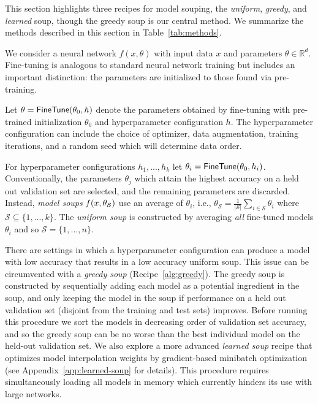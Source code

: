 \documentclass[nohyperref]{article}
\theoremstyle{plain}
\theoremstyle{definition}
\theoremstyle{remark}
\begin{document}
    
        
        
        This section highlights three recipes for model souping, the \emph{uniform}, \emph{greedy},
        and \emph{learned} soup, though the greedy soup is our central method.
        We summarize the methods described in this section in Table~\ref{tab:methods}.
        
        We consider a neural network $f(x, \theta)$ with input data $x$ and parameters
        $\theta \in \mathbb{R}^d$. Fine-tuning is analogous
        to standard neural network training but includes an important distinction: the parameters
        are initialized to those found via pre-training.
        
        Let $\theta = \mathsf{FineTune}\mleft(\theta_0, h\mright)$ denote the
        parameters obtained by fine-tuning with pre-trained initialization $\theta_0$ and
        hyperparameter configuration $h$.
        The hyperparameter configuration can include the
        choice of optimizer, data augmentation, training iterations, and a random
        seed which will determine data order. 
        
        For hyperparameter
        configurations $h_1,...,h_k$ let
        $\theta_i = \mathsf{FineTune}\mleft(\theta_0, h_i\mright)$.
        Conventionally, the parameters $\theta_j$ which attain the highest
        accuracy on a held out validation set  are selected, and the remaining parameters are discarded.
        Instead, \emph{model soups} $f\mleft(x, \theta_{\mathcal{S}}\mright)$ use an average
        of $\theta_i$, i.e., $ \theta_{\mathcal{S}} = \frac{1}{|\mathcal{S}|}\sum_{i \in \mathcal{S}} \theta_i$
        where $\mathcal{S} \subseteq \{1,...,k\}$.
        The \emph{uniform soup}
        is constructed by averaging \emph{all} fine-tuned models $\theta_i$ and so $\mathcal{S} = \{1,...,n\}$.
        
        
        There are settings in which 
        a hyperparameter configuration can produce
        a model with low accuracy that results in a low accuracy uniform soup.
        This issue can be circumvented with a \emph{greedy soup} (Recipe~\ref{alg:greedy}).
        The greedy soup is constructed by sequentially adding each model as
        a potential ingredient in the soup, and only keeping the model in the soup
        if performance on a held out validation set (disjoint from the training and test sets) improves.
        Before running this procedure we
        sort the models in decreasing order of validation set accuracy, and so the greedy soup can be
        no worse than the best individual model on the held-out validation set. We also explore a more advanced \emph{learned soup} recipe that optimizes model interpolation weights by gradient-based minibatch optimization (see Appendix~\ref{app:learned-soup} for details). This procedure requires simultaneously loading all models in memory which currently 
        hinders its use with large networks.
    
\end{document}
